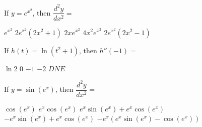 \begin{questions}
    \question If $y = e^{x^2}$, then $\dfrac{d^2y}{dx^2} = $ \\

    \begin{oneparchoices}
        \choice $e^{x^2}$
        \choice $2e^{x^2}\left(2x^2 + 1\right)$
        \choice $2xe^{x^2}$
        \choice $4x^2e^{x^2}$
        \choice $2e^{x^2}\left(2x^2 - 1\right)$
    \end{oneparchoices} \par \horizontalline

    \question If $h(t) = \ln \left(t^2 + 1\right)$, then $h''(-1) = $ \\

    \begin{oneparchoices}
        \choice $\ln 2$
        \choice $0$
        \choice $-1$
        \choice $-2$
        \choice $DNE$
    \end{oneparchoices} \par \horizontalline

    \question If $y = \sin \left(e^x\right)$, then $\dfrac{d^2y}{dx^2} = $ \\

    \begin{oneparchoices}
        \choice $\cos \left(e^x\right)$
        \choice $e^x \cos \left(e^x\right)$
        \choice $e^x\sin \left(e^x\right) + e^x\cos \left(e^x\right)$ \\[11pt]
        \makebox[0.12\textwidth] \choice $-e^x\sin \left(e^x\right) + e^x\cos \left(e^x\right)$
        \makebox[0.20\textwidth]\choice $-e^x\left(e^x\sin \left(e^x\right) - \cos \left(e^x\right)\right)$
    \end{oneparchoices} \par \horizontalline
\end{questions} 
